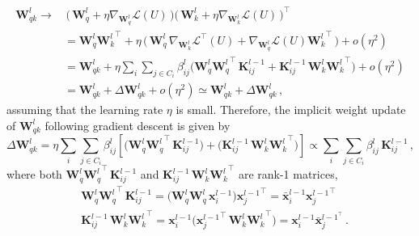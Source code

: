 \begin{remark}
%
\begin{equation}
\begin{split}
    \bm{W}_{qk}^l \rightarrow & 
    \,\big(\, \bm{W}^l_q + \eta\nabla_{\bm{W}_q^l} \mathcal{L}(U) \,\big)\big(\,\bm{W}^l_k + \eta\nabla_{\bm{W}_k^l} \mathcal{L}(U) \,\big)^\top \\
    & = \bm{W}^l_q{\bm{W}^l_k}^\top + \eta\, \big(\, \bm{W}^l_q\,{\nabla_{\bm{W}_k^l} \mathcal{L}}^\top (U) + \nabla_{\bm{W}_q^l} \mathcal{L}(U){\bm{W}^l_k}^\top \,\big) + o(\eta^2) \\
    & = \bm{W}_{qk}^l + \eta \sum_i \sum_{j\in C_i} \beta_{ij}^l\big(\bm{W}_q^l{\bm{W}_q^l}^\top\, \bm{K}_{ij}^{l-1} + \bm{K}_{ij}^{l-1}\,\bm{W}_k^l{\bm{W}_k^l}^\top \big) 
    + o(\eta^2) \\
    & = \bm{W}_{qk}^l + \Delta \bm{W}_{qk}^l + o(\eta^2) \simeq \bm{W}_{qk}^l + \Delta \bm{W}_{qk}^l \,,
\end{split}
\end{equation}
%
assuming that the learning rate $\eta$ is small. 
%
Therefore, the implicit weight update of $\bm{W}_{qk}^l$ following gradient descent is given by
%
\begin{equation}
    \Delta \bm{W}_{qk}^l    = \eta \sum_i \sum_{j\in C_i} \beta_{ij}^l
    \left[\big(\bm{W}_q^l{\bm{W}_q^l}^\top\, \bm{K}_{ij}^{l-1} \big)
    + 
    \big(\bm{K}_{ij}^{l-1}\,\bm{W}_k^l{\bm{W}_k^l}^\top \big)\right] 
    \propto \sum_i \sum_{j\in C_i} \beta_{ij}^l\, \bm{K}_{ij}^{l-1} \,,
\end{equation}
%
where both $\bm{W}_q^l{\bm{W}_q^l}^\top\, \bm{K}_{ij}^{l-1}$ and $\bm{K}_{ij}^{l-1}\,\bm{W}_k^l{\bm{W}_k^l}^\top$ are rank-1 matrices, 
%
\begin{equation}
\begin{split}
    & \bm{W}_q^l{\bm{W}_q^l}^\top\, \bm{K}_{ij}^{l-1} = \Big( \bm{W}_q^l{\bm{W}_q^l} \,\bm{x}^{l-1}_i\Big){\bm{x}^{l-1}_j}^\top = \bm{\bar{x}}^{l-1}_i {\bm{x}^{l-1}_j}^\top  \\
    & \bm{K}_{ij}^{l-1}\,\bm{W}_k^l{\bm{W}_k^l}^\top = \bm{x}^{l-1}_i\Big({\bm{x}^{l-1}_j}^\top\,\bm{W}_k^l{\bm{W}_k^l}^\top \Big) = \bm{x}^{l-1}_i \bm{\bar{x}}_j^{{l-1}^\top} \,.
\end{split}
\end{equation}
%
%
\end{remark}